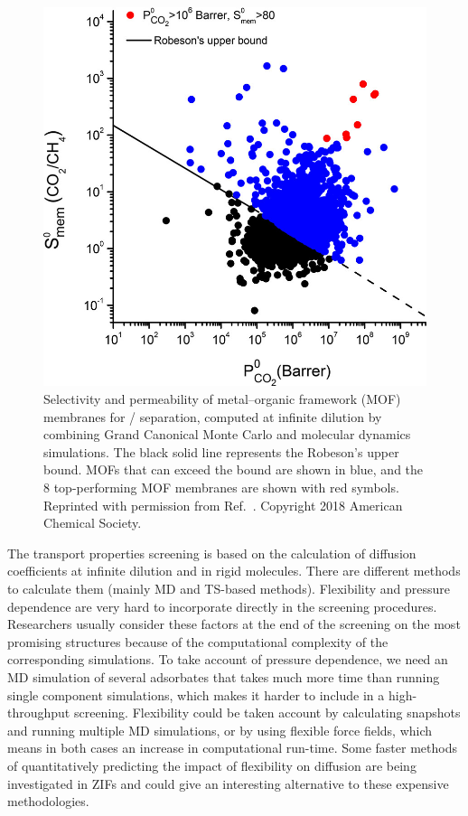 \documentclass[main.tex]{subfiles}
\begin{document}
\begin{figure}[ht]
\centering
  \includegraphics[width=0.5\linewidth]{figures/1-screening/Altintas_2018.jpeg}
  \caption{Selectivity and permeability of metal--organic framework (MOF) membranes for / separation, computed at infinite dilution by combining Grand Canonical Monte Carlo and molecular dynamics simulations.\cite{Altintas_2018} The black solid line represents the Robeson's upper bound.\cite{robeson1991correlation, Robeson_2008} MOFs that can exceed the bound are shown in blue, and the 8 top-performing MOF membranes are shown with red symbols. Reprinted with permission from Ref.~. Copyright 2018 American Chemical Society.}
  \label{fgr:Altintas_2018}
\end{figure}

The transport properties screening is based on the calculation of diffusion coefficients at infinite dilution and in rigid molecules. There are different methods to calculate them (mainly MD and TS-based methods). Flexibility and pressure dependence are very hard to incorporate directly in the screening procedures. Researchers usually consider these factors at the end of the screening on the most promising structures because of the computational complexity of the corresponding simulations. {To take account of} pressure dependence, {we need} an MD simulation of several adsorbates { that takes much more time than running single component simulations},\cite{Keskin_2007, Keskin_2009} which {makes it harder to include in a} high-throughput screening. Flexibility could be taken account by calculating snapshots and running multiple MD simulations, or by using flexible force fields, which means in both cases an increase in computational run-time. Some faster methods of quantitatively predicting the impact of flexibility on diffusion are being investigated in ZIFs and could give an interesting alternative to these expensive methodologies.\cite{Han_2020}
\end{document}
